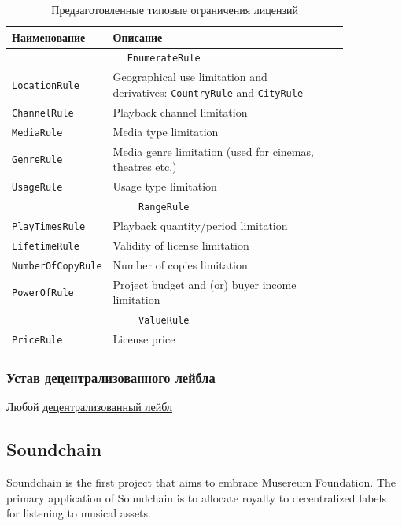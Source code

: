 \documentclass[12pt]{report}
\def\code#1{\colorbox{light-gray}{\texttt{#1}}}
\begin{document}
\begin{table}[H]
\centering
\caption{Предзаготовленные типовые ограничения лицензий}
\begin{tabular}{p{0.2\linewidth}p{0.65\linewidth}cc}
\toprule
Наименование & Описание \\
\bottomrule
\toprule
\multicolumn{2}{c}{\code{EnumerateRule}} \\
\midrule
	\code{LocationRule} & Geographical use limitation and derivatives: \code{CountryRule} and \code{CityRule} \\
	\code{ChannelRule} & Playback channel limitation \\
	\code{MediaRule} & Media type limitation \\
	\code{GenreRule} & Media genre limitation (used for cinemas, theatres etc.) \\
	\code{UsageRule} & Usage type limitation \\
\bottomrule
\toprule
\multicolumn{2}{c}{\code{RangeRule}} \\
\midrule
	\code{PlayTimesRule} & Playback quantity/period limitation \\
	\code{LifetimeRule} & Validity of license limitation \\
	\code{NumberOfCopyRule} & Number of copies limitation \\
	\code{PowerOfRule} & Project budget and (or) buyer income limitation \\
\bottomrule
\toprule
\multicolumn{2}{c}{\code{ValueRule}} \\
\midrule
	\code{PriceRule} & License price \\
\bottomrule
\end{tabular}
\end{table}

\subsubsection{Устав децентрализованного лейбла}
\label{tech-apps-dal-charter}
Любой \hyperref[tech-apps-dal]{децентрализованный лейбл} 
\subsection{Soundchain}
\label{tech-apps-soundchain}
Soundchain is the first project that aims to embrace Musereum Foundation. The primary application of Soundchain is to allocate royalty to decentralized labels for listening to musical assets.
\end{document}
